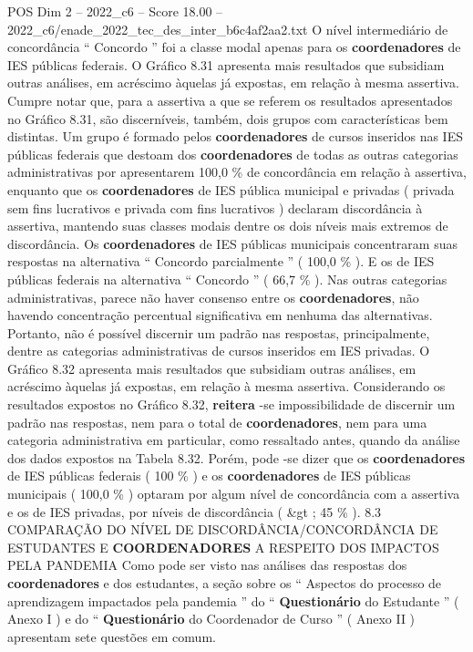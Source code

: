 \begin{textsample}{POS Dim 2 – 2022\_c6 – Score 18.00 – 2022\_c6/enade\_2022\_tec\_des\_inter\_b6c4af2aa2.txt}
O nível intermediário de concordância “ Concordo ” foi a classe modal apenas para os \textbf{coordenadores} de IES públicas federais.
O Gráfico 8.31 apresenta mais resultados que subsidiam outras análises, em acréscimo àquelas já expostas, em relação à mesma assertiva.
Cumpre notar que, para a assertiva a que se referem os resultados apresentados no Gráfico 8.31, são discerníveis, também, dois grupos com características bem distintas.
Um grupo é formado pelos \textbf{coordenadores} de cursos inseridos nas IES públicas federais que destoam dos \textbf{coordenadores} de todas as outras categorias administrativas por apresentarem 100,0 \% de concordância em relação à assertiva, enquanto que os \textbf{coordenadores} de IES pública municipal e privadas ( privada sem fins lucrativos e privada com fins lucrativos ) declaram discordância à assertiva, mantendo suas classes modais dentre os dois níveis mais extremos de discordância.
Os \textbf{coordenadores} de IES públicas municipais concentraram suas respostas na alternativa “ Concordo parcialmente ” ( 100,0 \% ).
E os de IES públicas federais na alternativa “ Concordo ” ( 66,7 \% ).
Nas outras categorias administrativas, parece não haver consenso entre os \textbf{coordenadores}, não havendo concentração percentual significativa em nenhuma das alternativas.
Portanto, não é possível discernir um padrão nas respostas, principalmente, dentre as categorias administrativas de cursos inseridos em IES privadas.
O Gráfico 8.32 apresenta mais resultados que subsidiam outras análises, em acréscimo àquelas já expostas, em relação à mesma assertiva.
Considerando os resultados expostos no Gráfico 8.32, \textbf{reitera} -se impossibilidade de discernir um padrão nas respostas, nem para o total de \textbf{coordenadores}, nem para uma categoria administrativa em particular, como ressaltado antes, quando da análise dos dados expostos na Tabela 8.32.
Porém, pode -se dizer que os \textbf{coordenadores} de IES públicas federais ( 100 \% ) e os \textbf{coordenadores} de IES públicas municipais ( 100,0 \% ) optaram por algum nível de concordância com a assertiva e os de IES privadas, por níveis de discordância ( \&gt ; 45 \% ). 8.3 COMPARAÇÃO DO NÍVEL DE DISCORDÂNCIA/CONCORDÂNCIA DE ESTUDANTES E \textbf{COORDENADORES} A RESPEITO DOS IMPACTOS PELA PANDEMIA Como pode ser visto nas análises das respostas dos \textbf{coordenadores} e dos estudantes, a seção sobre os “ Aspectos do processo de aprendizagem impactados pela pandemia ” do “ \textbf{Questionário} do Estudante ” ( Anexo I ) e do “ \textbf{Questionário} do Coordenador de Curso ” ( Anexo II ) apresentam sete questões em comum.

\end{textsample}
